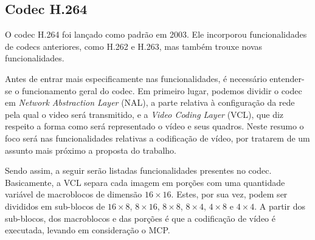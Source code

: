 \documentclass[cic,tc]{iiufrgs}
\begin{document}
\subsection*{Codec H.264}
O codec H.264 foi lançado como padrão em 2003.
Ele incorporou funcionalidades de codecs anteriores, como H.262 e H.263, mas também
trouxe novas funcionalidades.

Antes de entrar mais especificamente nas funcionalidades, é necessário entender-se o 
funcionamento geral do codec.
Em primeiro lugar, podemos dividir o codec em \emph{Network Abstraction Layer} (NAL), a parte
relativa à configuração da rede pela qual o video será transmitido,
e a \emph{Video Coding Layer} (VCL), que diz respeito a forma como será representado o vídeo 
e seus quadros.
Neste resumo o foco será nas funcionalidades relativas a codificação de vídeo, 
por tratarem de um assunto mais próximo a proposta do trabalho.

Sendo assim, a seguir serão listadas funcionalidades presentes no codec.
Basicamente, a VCL separa cada imagem em porções com uma quantidade variável de macroblocos 
de dimensão $16\times16$.
Estes, por sua vez, podem ser divididos em sub-blocos de $16\times8$, $8\times16$,
$8\times8$, $8\times4$, $4\times8$ e $4\times4$.
A partir dos sub-blocos, dos macroblocos e das porções é que a codificação de vídeo 
é executada, levando em consideração o MCP.
\end{document}
